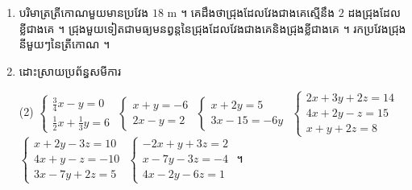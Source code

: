 \begin{enumerate}[1]
  \item បរិមាត្រត្រីកោណមួយមានប្រវែង $18$ m ។ គេដឹងថាជ្រុងដែលវែងជាងគេស្មើនឹង $2$ ដងជ្រុងដែលខ្លីជាងគេ ។ ជ្រុងមួយទៀតជាមធ្យមនព្វន្តនៃជ្រុងដែលវែងជាងគេនិងជ្រុងខ្លីជាងគេ ។ រកប្រវែងជ្រុងនីមួយៗនៃត្រីកោណ ។
  \item ដោះស្រាយប្រព័ន្ធសមីការ
  \begin{tasks}(2)
    \task $\begin{cases} \frac{3}{4}x - y = 0\\ \frac{1}{2}x + \frac{1}{3}y = 6 \end{cases}$
    \task $\begin{cases} x + y = -6\\ 2x - y = 2 \end{cases}$
    \task $\begin{cases} x + 2y = 5\\ 3x - 15 = -6y \end{cases}$
    \task $\begin{cases} 2x + 3y + 2z = 14\\ 4x + 2y - z = 15\\ x + y + 2z = 8 \end{cases}$
    \task $\begin{cases} x + 2y - 3z = 10\\ 4x + y - z = -10\\ 3x - 7y + 2z = 5 \end{cases}$
    \task $\begin{cases} -2x + y + 3z = 2\\ x - 7y - 3z = -4\\ 4x - 2y - 6z = 1 \end{cases}$ ។
  \end{tasks}
\end{enumerate}
